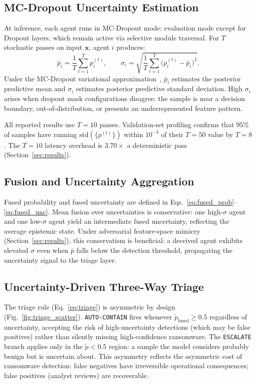 \documentclass[journal]{IEEEtran}
\begin{document}
\subsection{MC-Dropout Uncertainty Estimation}

At inference, each agent runs in MC-Dropout mode: evaluation mode except for Dropout
layers, which remain active via selective module traversal.
For $T$ stochastic passes on input $\mathbf{x}$, agent $i$ produces:
\begin{equation}
\bar{p}_i = \frac{1}{T}\sum_{t=1}^{T} p_i^{(t)},
\qquad
\sigma_i = \sqrt{\frac{1}{T}\sum_{t=1}^{T}\bigl(p_i^{(t)} - \bar{p}_i\bigr)^2}.
\label{eq:mc_dropout}
\end{equation}
Under the MC-Dropout variational approximation~\cite{gal2016dropout},
$\bar{p}_i$ estimates the posterior predictive mean and $\sigma_i$
estimates posterior predictive standard deviation.
High $\sigma_i$ arises when dropout mask configurations disagree: the sample is near
a decision boundary, out-of-distribution, or presents an underrepresented feature pattern.

All reported results use $T=10$ passes.
Validation-set profiling confirms that $95\%$ of samples have running
$\mathrm{std}(\{p^{(t)}\})$ within $10^{-3}$ of their $T=50$ value by $T=8$.
The $T=10$ latency overhead is $3.70\times$ a deterministic pass
(Section~\ref{sec:results}).

\subsection{Fusion and Uncertainty Aggregation}

Fused probability and fused uncertainty are defined in
Eqs.~\eqref{eq:fused_prob}--\eqref{eq:fused_unc}.
Mean fusion over uncertainties is conservative: one high-$\sigma$ agent and one
low-$\sigma$ agent yield an intermediate fused uncertainty, reflecting the average
epistemic state.
Under adversarial feature-space mimicry (Section~\ref{sec:results}), this conservatism
is beneficial: a deceived agent exhibits elevated $\sigma$ even when $\bar{p}$ falls
below the detection threshold, propagating the uncertainty signal to the triage layer.

\subsection{Uncertainty-Driven Three-Way Triage}

The triage rule (Eq.~\eqref{eq:triage}) is asymmetric by design
(Fig.~\ref{fig:triage_scatter}).
\texttt{AUTO-CONTAIN} fires whenever $\tilde{p}_{\mathrm{fused}} \geq 0.5$ regardless of
uncertainty, accepting the risk of high-uncertainty detections (which may be false
positives) rather than silently missing high-confidence ransomware.
The \texttt{ESCALATE} branch applies only in the $\tilde{p} < 0.5$ region: a sample
the model considers probably benign but is uncertain about.
This asymmetry reflects the asymmetric cost of ransomware detection: false negatives
have irreversible operational consequences; false positives (analyst reviews) are
recoverable.
\end{document}
